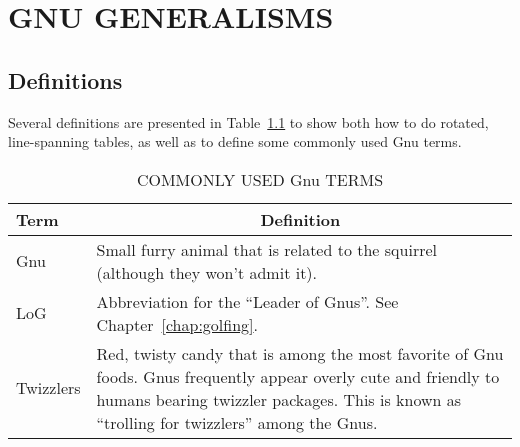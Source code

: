 %
%
%
%
%
%
%
%

%
%

\chapter{GNU GENERALISMS}

\section{Definitions}

Several definitions are presented in Table~\ref{tbl:defs} to show both
how to do rotated, line-spanning tables, as well as to define some
commonly used Gnu terms.

\begin{landscape}
\begin{table}
\centering
\caption{COMMONLY USED Gnu TERMS \label{tbl:defs}}
\begin{tabular}{lp{5in}}
\toprule
Term & \multicolumn{1}{c}{Definition} \\
\midrule
Gnu & Small furry animal that is related to the squirrel 
(although they won't admit it). \\
LoG & Abbreviation for the ``Leader of Gnus''.  See
Chapter~\ref{chap:golfing}. \\
Twizzlers & Red, twisty candy that is among the most favorite of Gnu
foods.  Gnus frequently appear overly cute and friendly to humans
bearing twizzler packages.  This is known as ``trolling for twizzlers''
among the Gnus. \\
\bottomrule
\end{tabular}
\end{table}
\end{landscape}

